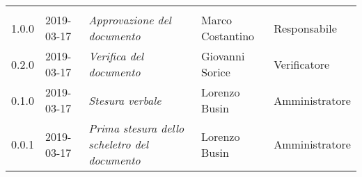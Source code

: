 \newpage 
\section*{}
\begin{longtable}{C{2cm}|C{2.5cm}|C{4.5cm}|C{2.5cm}|C{3cm}}
	
	 &  &  &  &   \\
	\endhead
		
		1.0.0 & 2019-03-17 & \emph{Approvazione del documento} & Marco Costantino & Responsabile \\
		\hline
		
		 0.2.0 & 2019-03-17 & \emph{Verifica del documento} & Giovanni Sorice & Verificatore\\
		\hline

		 0.1.0 & 2019-03-17 & \emph{Stesura verbale} & Lorenzo Busin & Amministratore\\
		\hline
		
		 0.0.1 & 2019-03-17 & \emph{Prima stesura dello scheletro del documento} & Lorenzo Busin & Amministratore\\
		
\end{longtable}

\clearpage